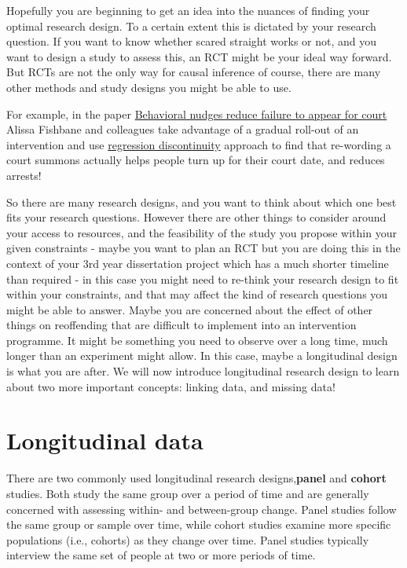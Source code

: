 \documentclass[
]{book}
\begin{document}
Hopefully you are beginning to get an idea into the nuances of finding your optimal research design. To a certain extent this is dictated by your research question. If you want to know whether scared straight works or not, and you want to design a study to assess this, an RCT might be your ideal way forward. But RCTs are not the only way for causal inference of course, there are many other methods and study designs you might be able to use.

For example, in the paper \href{https://science.sciencemag.org/content/early/2020/10/07/science.abb6591/tab-pdf}{Behavioral nudges reduce failure to appear for court} Alissa Fishbane and colleagues take advantage of a gradual roll-out of an intervention and use \href{https://methods.sagepub.com/reference/encyc-of-research-design/n375.xml}{regression discontinuity} approach to find that re-wording a court summons actually helps people turn up for their court date, and reduces arrests!

So there are many research designs, and you want to think about which one best fits your research questions. However there are other things to consider around your access to resources, and the feasibility of the study you propose within your given constraints - maybe you want to plan an RCT but you are doing this in the context of your 3rd year dissertation project which has a much shorter timeline than required - in this case you might need to re-think your research design to fit within your constraints, and that may affect the kind of research questions you might be able to answer. Maybe you are concerned about the effect of other things on reoffending that are difficult to implement into an intervention programme. It might be something you need to observe over a long time, much longer than an experiment might allow. In this case, maybe a longitudinal design is what you are after. We will now introduce longitudinal research design to learn about two more important concepts: linking data, and missing data!

\hypertarget{longitudinal-data}{%
\section{Longitudinal data}\label{longitudinal-data}}

There are two commonly used longitudinal research designs,\textbf{panel} and \textbf{cohort} studies. Both study the same group over a period of time and are generally concerned with assessing within- and between-group change. Panel studies follow the same group or sample over time, while cohort studies examine more specific populations (i.e., cohorts) as they change over time. Panel studies typically interview the same set of people at two or more periods of time.
\end{document}
